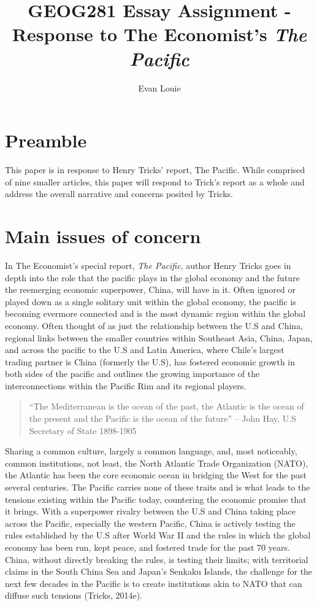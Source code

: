 \documentclass[man,donotrepeattitle,letter]{apa6}
\title{GEOG281 Essay Assignment - Response to The Economist's \textit{The Pacific}}
\author{Evan Louie}
\affiliation{University of British Columbia}
\begin{document}
\maketitle

\tableofcontents
\newpage
\section{Preamble}
This paper is in response to Henry Tricks' report, The Pacific.  While comprised of nine smaller articles, this paper will respond to Trick's report as a whole and address the overall narrative and concerns posited by Tricks.

\section{Main issues of concern}
In The Economist's special report, \textit{The Pacific}, author Henry Tricks goes in depth into the role that the pacific plays in the global economy and the future the reemerging economic superpower, China, will have in it.  Often ignored or played down as a single solitary unit within the global economy, the pacific is becoming evermore connected and is the most dynamic region within the global economy.  Often thought of as just the relationship between the U.S and China, regional links between the smaller countries within Southeast Asia, China, Japan, and across the pacific to the U.S and Latin America, where Chile's largest trading partner is China (formerly the U.S), has fostered economic growth in both sides of the pacific and outlines the growing importance of the interconnections within the Pacific Rim and its regional players.

\begin{quotation}
  ``The Mediterranean is the ocean of the past, the Atlantic is the ocean of the present and the Pacific is the ocean of the future'' -- John Hay, U.S Secretary of State 1898-1905
\end{quotation}

Sharing a common culture, largely a common language, and, most noticeably, common institutions, not least, the North Atlantic Trade Organization (NATO), the Atlantic has been the core economic ocean in bridging the West for the past several centuries.  The Pacific carries none of these traits and is what leads to the tensions existing within the Pacific today, countering the economic promise that it brings. With a superpower rivalry between the U.S and China taking place across the Pacific, especially the western Pacific, China is actively testing the rules established by the U.S after World War II and the rules in which the global economy has been run, kept peace, and fostered trade for the past 70 years. China, without directly breaking the rules, is testing their limits; with territorial claims in the South China Sea and Japan's Senkaku Islands, the challenge for the next few decades in the Pacific is to create institutions akin to NATO that can diffuse such tensions (Tricks, 2014e).
\end{document}
